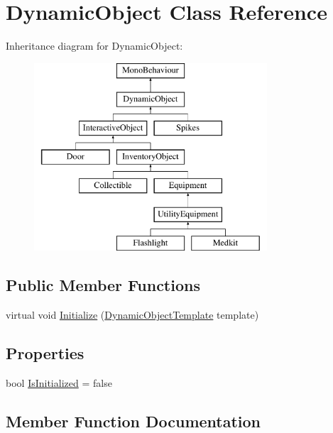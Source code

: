 \hypertarget{class_dynamic_object}{}\section{Dynamic\+Object Class Reference}
\label{class_dynamic_object}
Inheritance diagram for Dynamic\+Object\+:\begin{figure}[H]
\begin{center}
\leavevmode
\includegraphics[height=7.000000cm]{class_dynamic_object}
\end{center}
\end{figure}
\subsection*{Public Member Functions}
\begin{DoxyCompactItemize}
\item 
virtual void \mbox{\hyperlink{class_dynamic_object_a51dc678c061bc3a5eb60c3d96a1ef506}{Initialize}} (\mbox{\hyperlink{class_dynamic_object_template}{Dynamic\+Object\+Template}} template)
\end{DoxyCompactItemize}
\subsection*{Properties}
\begin{DoxyCompactItemize}
\item 
bool \mbox{\hyperlink{class_dynamic_object_a3d8a7d1c1a8630b595aded3b0d171334}{Is\+Initialized}} = false
\end{DoxyCompactItemize}


\subsection{Member Function Documentation}
\mbox{\label{class_dynamic_object_a51dc678c061bc3a5eb60c3d96a1ef506}} 
